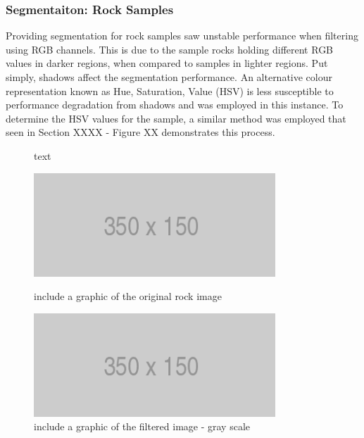 \documentclass[a4paper]{article}
\begin{document}
\subsubsection{Segmentaiton: Rock Samples}

Providing segmentation for rock samples saw unstable performance when filtering using RGB channels. This is due to the sample rocks holding different RGB values in darker regions, when compared to samples in lighter regions. Put simply, shadows affect the segmentation performance. An alternative colour representation known as Hue, Saturation, Value (HSV) is less susceptible to performance degradation from shadows and was employed in this instance. To determine the HSV values for the sample, a similar method was employed that seen in Section XXXX - Figure XX demonstrates this process.  

\begin{figure}[h]\scriptsize
\begin{sexylisting}{text}

\end{sexylisting}
\end{figure}

\begin{figure}[h]
\centering
\begin{minipage}[t]{0.45\linewidth}
\centering
\includegraphics[scale=0.5]{placeholder}
\caption{include a graphic of the original rock image}
\end{minipage}
\hspace{0.5cm}
\begin{minipage}[t]{0.45\linewidth}
\centering
\includegraphics[scale=0.5]{placeholder}
\caption{include a graphic of the filtered image - gray scale}
\end{minipage}
\end{figure}
\end{document}

